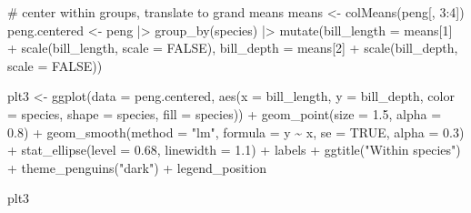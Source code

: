 \documentclass[
  letterpaper,
  10pt,
  krantz2]{krantz}
\makeatletter
\newenvironment{Shaded}{\begin{snugshade}}{\end{snugshade}}
\newcommand{\AttributeTok}[1]{\textcolor[rgb]{0.40,0.45,0.13}{#1}}
\newcommand{\CommentTok}[1]{\textcolor[rgb]{0.37,0.37,0.37}{#1}}
\newcommand{\ConstantTok}[1]{\textcolor[rgb]{0.56,0.35,0.01}{#1}}
\newcommand{\DecValTok}[1]{\textcolor[rgb]{0.68,0.00,0.00}{#1}}
\newcommand{\FloatTok}[1]{\textcolor[rgb]{0.68,0.00,0.00}{#1}}
\newcommand{\FunctionTok}[1]{\textcolor[rgb]{0.28,0.35,0.67}{#1}}
\newcommand{\NormalTok}[1]{\textcolor[rgb]{0.00,0.23,0.31}{#1}}
\newcommand{\OtherTok}[1]{\textcolor[rgb]{0.00,0.23,0.31}{#1}}
\newcommand{\SpecialCharTok}[1]{\textcolor[rgb]{0.37,0.37,0.37}{#1}}
\newcommand{\StringTok}[1]{\textcolor[rgb]{0.13,0.47,0.30}{#1}}
\newenvironment{kframe}{%
  \medskip{}
  \setlength{\fboxsep}{.8em}
  \def\at@end@of@kframe{}%
  \ifinner\ifhmode%
  \def\at@end@of@kframe{\end{minipage}}%
  \begin{minipage}{\columnwidth}%
  \fi\fi%
  \def\FrameCommand##1{\hskip\@totalleftmargin \hskip-\fboxsep
  \colorbox{shadecolor}{##1}\hskip-\fboxsep
      \hskip-\linewidth \hskip-\@totalleftmargin \hskip\columnwidth}%
  \MakeFramed {\advance\hsize-\width
    \@totalleftmargin\z@ \linewidth\hsize
    \@setminipage}}%
{\par\unskip\endMakeFramed%
  \at@end@of@kframe}
\renewenvironment{Shaded}{\begin{kframe}}{\end{kframe}}
\makeatother
\begin{document}
\begin{Shaded}
\begin{Highlighting}[]
\CommentTok{\# center within groups, translate to grand means}
\NormalTok{means }\OtherTok{\textless{}{-}} \FunctionTok{colMeans}\NormalTok{(peng[, }\DecValTok{3}\SpecialCharTok{:}\DecValTok{4}\NormalTok{])}
\NormalTok{peng.centered }\OtherTok{\textless{}{-}}\NormalTok{ peng }\SpecialCharTok{|\textgreater{}}
  \FunctionTok{group\_by}\NormalTok{(species) }\SpecialCharTok{|\textgreater{}}
  \FunctionTok{mutate}\NormalTok{(}\AttributeTok{bill\_length =}\NormalTok{ means[}\DecValTok{1}\NormalTok{] }\SpecialCharTok{+} \FunctionTok{scale}\NormalTok{(bill\_length, }\AttributeTok{scale =} \ConstantTok{FALSE}\NormalTok{),}
         \AttributeTok{bill\_depth  =}\NormalTok{ means[}\DecValTok{2}\NormalTok{] }\SpecialCharTok{+} \FunctionTok{scale}\NormalTok{(bill\_depth, }\AttributeTok{scale =} \ConstantTok{FALSE}\NormalTok{))}

\NormalTok{plt3 }\OtherTok{\textless{}{-}} \FunctionTok{ggplot}\NormalTok{(}\AttributeTok{data =}\NormalTok{ peng.centered,}
               \FunctionTok{aes}\NormalTok{(}\AttributeTok{x =}\NormalTok{ bill\_length,}
                   \AttributeTok{y =}\NormalTok{ bill\_depth,}
                   \AttributeTok{color =}\NormalTok{ species,}
                   \AttributeTok{shape =}\NormalTok{ species,}
                   \AttributeTok{fill =}\NormalTok{ species)) }\SpecialCharTok{+}
  \FunctionTok{geom\_point}\NormalTok{(}\AttributeTok{size =} \FloatTok{1.5}\NormalTok{,}
             \AttributeTok{alpha =} \FloatTok{0.8}\NormalTok{) }\SpecialCharTok{+}
  \FunctionTok{geom\_smooth}\NormalTok{(}\AttributeTok{method =} \StringTok{"lm"}\NormalTok{, }\AttributeTok{formula =}\NormalTok{ y }\SpecialCharTok{\textasciitilde{}}\NormalTok{ x, }
              \AttributeTok{se =} \ConstantTok{TRUE}\NormalTok{, }\AttributeTok{alpha =} \FloatTok{0.3}\NormalTok{) }\SpecialCharTok{+}
  \FunctionTok{stat\_ellipse}\NormalTok{(}\AttributeTok{level =} \FloatTok{0.68}\NormalTok{, }\AttributeTok{linewidth =} \FloatTok{1.1}\NormalTok{) }\SpecialCharTok{+}
\NormalTok{  labels }\SpecialCharTok{+}
  \FunctionTok{ggtitle}\NormalTok{(}\StringTok{"Within species"}\NormalTok{) }\SpecialCharTok{+}
  \FunctionTok{theme\_penguins}\NormalTok{(}\StringTok{"dark"}\NormalTok{) }\SpecialCharTok{+}
\NormalTok{  legend\_position }

\NormalTok{plt3}
\end{Highlighting}
\end{Shaded}
\end{document}
